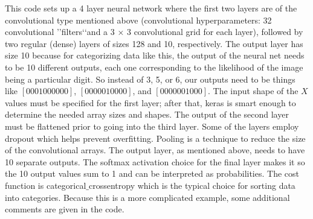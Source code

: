 This code sets up a 4 layer neural network where the first two layers are
of the convolutional type mentioned above (convolutional hyperparameters:
32 convolutional \rq\rq filters\lq\lq and a 3 × 3 convolutional grid for each layer), followed by two regular (dense) layers of sizes 128 and 10, respectively. The output layer has size 10 because for categorizing data like this, the output of the
neural net needs to be 10 different outputs, each one corresponding to the likelihood of the image being a particular digit. So instead of 3, 5, or 6, our outputs
need to be things like $[0 0 0 1 0 0 0 0 0 0]$, $[0 0 0 0 0 1 0 0 0 0]$, and
$[0 0 0 0 0 0 1 0 0 0]$.
The input shape of the $X$ values must be specified for the first layer; after that, keras is smart enough to determine the needed array sizes and shapes. The output of the second layer must be flattened prior to going into the third layer. Some of the layers employ dropout which helps prevent overfitting. Pooling is a technique to reduce the size of the convolutional arrays. The output layer, as mentioned above, needs to have 10 separate outputs. The softmax activation choice for the final layer makes it so the 10 output values sum to 1 and can be interpreted as probabilities. The cost function is categorical$\_$crossentropy which is the typical choice for sorting data into categories. Because this is a more complicated example, some additional comments are given in the code.

